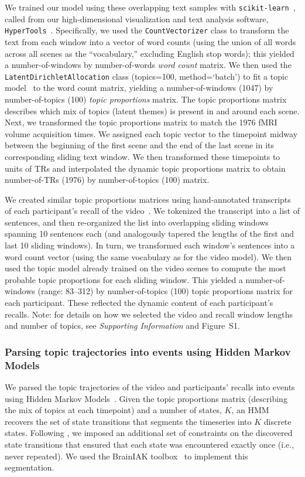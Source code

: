 \documentclass{article}
\newcommand{\topicopt}{S1}
\begin{document}
We trained our model using these overlapping text samples with \texttt{scikit-learn}~\citep[version 0.19.1; ][]{PedrEtal11}, called from our high-dimensional visualization and text analysis software, \texttt{HyperTools}~\citep{HeusEtal18a}.  Specifically, we used the \texttt{CountVectorizer} class to transform the text from each window into a vector of word counts (using the union of all words across all scenes as the ``vocabulary,'' excluding English stop words); this yielded a number-of-windows by number-of-words \textit{word count} matrix.  We then used the \texttt{LatentDirichletAllocation} class (topics=100, method=`batch') to fit a topic model~\citep{BleiEtal03} to the word count matrix, yielding a number-of-windows (1047) by number-of-topics (100) \textit{topic proportions} matrix.  The topic proportions matrix describes which mix of topics (latent themes) is present in and around each scene.  Next, we transformed the topic proportions matrix to match the 1976 fMRI volume acquisition times.  We assigned each topic vector to the timepoint midway between the beginning of the first scene and the end of the last scene in its corresponding sliding text window.  We then transformed these timepoints to units of TRs and interpolated the dynamic topic proportions matrix to obtain number-of-TRs (1976) by number-of-topics (100) matrix.

We created similar topic proportions matrices using hand-annotated transcripts of each participant's recall of the video~\citep[annotated by ][]{ChenEtal17}.  We tokenized the transcript into a list of sentences, and then re-organized the list into overlapping sliding windows spanning 10 sentences each (and analogously tapered the lengths of the first and last 10 sliding windows).  In turn, we transformed each window's sentences into a word count vector (using the same vocabulary as for the video model).  We then used the topic model already trained on the video scenes to compute the most probable topic proportions for each sliding window.  This yielded a number-of-windows (range: 83--312) by number-of-topics (100) topic proportions matrix for each participant.  These reflected the dynamic content of each participant's recalls.  Note: for details on how we selected the video and recall window lengths and number of topics, see \textit{Supporting Information} and Figure~\topicopt.

\subsubsection*{Parsing topic trajectories into events using Hidden Markov Models}
We parsed the topic trajectories of the video and participants' recalls into events using Hidden Markov Models~\citep{Rabi89}.  Given the topic proportions matrix (describing the mix of topics at each timepoint) and a number of states, $K$, an HMM recovers the set of state transitions that segments the timeseries into $K$ discrete states.  Following \cite{BaldEtal17}, we imposed an additional set of constraints on the discovered state transitions that ensured that each state was encountered exactly once (i.e., never repeated).  We used the BrainIAK toolbox~\citep{Brainiak} to implement this segmentation.
\end{document}
